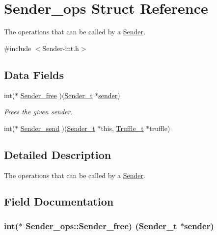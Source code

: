 \hypertarget{struct_sender__ops}{}\section{Sender\+\_\+ops Struct Reference}
\label{struct_sender__ops}


The operations that can be called by a \hyperlink{struct_sender}{Sender}.  




{\ttfamily \#include $<$Sender-\/int.\+h$>$}

\subsection*{Data Fields}
\begin{DoxyCompactItemize}
\item 
int($\ast$ \hyperlink{struct_sender__ops_a2df5af2a8f99a3e1c374506b3563c245}{Sender\+\_\+free} )(\hyperlink{struct_sender}{Sender\+\_\+t} $\ast$\hyperlink{spp__profinet_8c_a6aa2b3eed1dbaeff6fd73bd762ed09b4}{sender})
\begin{DoxyCompactList}\small\item\em Frees the given sender. \end{DoxyCompactList}\item 
int($\ast$ \hyperlink{struct_sender__ops_a5adaf20efba44db11aedbe2c6c01d666}{Sender\+\_\+send} )(\hyperlink{struct_sender}{Sender\+\_\+t} $\ast$this, \hyperlink{struct_truffle}{Truffle\+\_\+t} $\ast$truffle)
\end{DoxyCompactItemize}


\subsection{Detailed Description}
The operations that can be called by a \hyperlink{struct_sender}{Sender}. 

\subsection{Field Documentation}
\hypertarget{struct_sender__ops_a2df5af2a8f99a3e1c374506b3563c245}{}
\subsubsection[{Sender\+\_\+free}]{\setlength{\rightskip}{0pt plus 5cm}int($\ast$ Sender\+\_\+ops\+::\+Sender\+\_\+free) ({\bf Sender\+\_\+t} $\ast${\bf sender})}\label{struct_sender__ops_a2df5af2a8f99a3e1c374506b3563c245}


